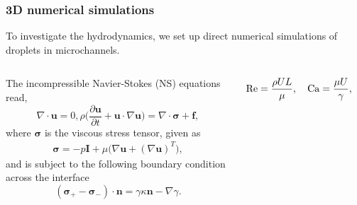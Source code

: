 \begin{frame}
  \frametitle{3D numerical simulations}

  To investigate the hydrodynamics, we set up direct numerical simulations of droplets in microchannels.
  \vskip0.3cm

  \pause
  \begin{columns}[T]

    \begin{column}{0.55\textwidth}
      \begin{bluecolorbox}
        The incompressible Navier-Stokes (NS) equations read,
        \begin{subequations} \label{eq:Navier-Sotkes}
          \begin{equation}
            \nabla \cdot {\bm u} = 0,
            \label{eq:div-free}
          \end{equation}
          \begin{equation}
            \rho \bigg(\frac{\partial {\bm u}}{\partial t} + {\bm u} \cdot \nabla {\bm u} \bigg) = \nabla \cdot {\bm \sigma} + {\bm f},
            \label{eq:NS}
          \end{equation}
        \end{subequations}
        where $\bm \sigma$ is the viscous stress tensor, given as
        \begin{equation}
          \begin{aligned}
            {\bm \sigma} = -p {\bm I}+ \mu \bigg( \nabla {\bm u} + (\nabla {\bm u})^T \bigg),
          \end{aligned}
        \end{equation}
        and is subject to the following boundary condition across the interface
        \begin{equation} \label{eq:stress-bc}
          ({\bm \sigma}_+ - {\bm \sigma}_- ) \cdot {\bm n} = \gamma \kappa {\bm n} - \nabla \gamma.
        \end{equation}
      \end{bluecolorbox}
    \end{column}

    \pause
    \begin{column}{0.4\textwidth}
      \centering
      \begin{bluecolorbox}
        \begin{equation} \notag
          \begin{aligned}
            \textrm{Re} = \frac{\rho UL}{\mu}, \quad
            \textrm{Ca} = \frac{\mu U}{\gamma}, \quad
            \textrm{Fr} = \frac{U^2}{FL}.  
          \end{aligned} \medskip
        \end{equation}
      \end{bluecolorbox}
      \vskip0.2cm


\end{column}
\end{columns}
\end{frame}
